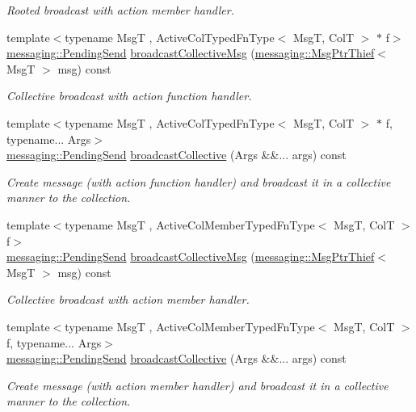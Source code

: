 \begin{DoxyCompactItemize}
\begin{DoxyCompactList}\small\item\em Rooted broadcast with action member handler. \end{DoxyCompactList}\item 
{\footnotesize template$<$typename MsgT , Active\+Col\+Typed\+Fn\+Type$<$ Msg\+T, Col\+T $>$ $\ast$ f$>$ }\\\hyperlink{structvt_1_1messaging_1_1_pending_send}{messaging\+::\+Pending\+Send} \hyperlink{structvt_1_1vrt_1_1collection_1_1_broadcastable_a70ec0f06ef5566c713a4d960a8faa39b}{broadcast\+Collective\+Msg} (\hyperlink{structvt_1_1messaging_1_1_msg_ptr_thief}{messaging\+::\+Msg\+Ptr\+Thief}$<$ MsgT $>$ msg) const
\begin{DoxyCompactList}\small\item\em Collective broadcast with action function handler. \end{DoxyCompactList}\item 
{\footnotesize template$<$typename MsgT , Active\+Col\+Typed\+Fn\+Type$<$ Msg\+T, Col\+T $>$ $\ast$ f, typename... Args$>$ }\\\hyperlink{structvt_1_1messaging_1_1_pending_send}{messaging\+::\+Pending\+Send} \hyperlink{structvt_1_1vrt_1_1collection_1_1_broadcastable_acef03dd57082f32556bef0e536a07fe9}{broadcast\+Collective} (Args \&\&... args) const
\begin{DoxyCompactList}\small\item\em Create message (with action function handler) and broadcast it in a collective manner to the collection. \end{DoxyCompactList}\item 
{\footnotesize template$<$typename MsgT , Active\+Col\+Member\+Typed\+Fn\+Type$<$ Msg\+T, Col\+T $>$ f$>$ }\\\hyperlink{structvt_1_1messaging_1_1_pending_send}{messaging\+::\+Pending\+Send} \hyperlink{structvt_1_1vrt_1_1collection_1_1_broadcastable_a70ec0f06ef5566c713a4d960a8faa39b}{broadcast\+Collective\+Msg} (\hyperlink{structvt_1_1messaging_1_1_msg_ptr_thief}{messaging\+::\+Msg\+Ptr\+Thief}$<$ MsgT $>$ msg) const
\begin{DoxyCompactList}\small\item\em Collective broadcast with action member handler. \end{DoxyCompactList}\item 
{\footnotesize template$<$typename MsgT , Active\+Col\+Member\+Typed\+Fn\+Type$<$ Msg\+T, Col\+T $>$ f, typename... Args$>$ }\\\hyperlink{structvt_1_1messaging_1_1_pending_send}{messaging\+::\+Pending\+Send} \hyperlink{structvt_1_1vrt_1_1collection_1_1_broadcastable_acef03dd57082f32556bef0e536a07fe9}{broadcast\+Collective} (Args \&\&... args) const
\begin{DoxyCompactList}\small\item\em Create message (with action member handler) and broadcast it in a collective manner to the collection. \end{DoxyCompactList}\end{DoxyCompactItemize}


